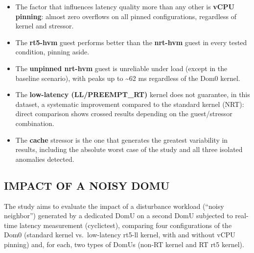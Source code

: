 \begin{itemize}
\item
  The factor that influences latency quality more than any other is
  \textbf{vCPU pinning}: almost zero overflows on all pinned
  configurations, regardless of kernel and stressor.
\item
  The \textbf{rt5-hvm} guest performs better than the \textbf{nrt-hvm}
  guest in every tested condition, pinning aside.
\item
  The \textbf{unpinned nrt-hvm} guest is unreliable under load (except
  in the baseline scenario), with peaks up to \textasciitilde62 ms
  regardless of the Dom0 kernel.
\item
  The \textbf{low-latency (LL/PREEMPT\_RT)} kernel does not guarantee,
  in this dataset, a systematic improvement compared to the standard
  kernel (NRT): direct comparison shows crossed results depending on the
  guest/stressor combination.
\item
  The \textbf{cache} stressor is the one that generates the greatest
  variability in results, including the absolute worst case of the study
  and all three isolated anomalies detected.
\end{itemize}

\subsection{IMPACT OF A NOISY DOMU}\label{impact-of-a-noisy-domu}

The study aims to evaluate the impact of a disturbance workload (``noisy
neighbor'') generated by a dedicated DomU on a second DomU subjected to
real-time latency measurement (cyclictest), comparing four
configurations of the Dom0 (standard kernel vs.~low-latency rt5-ll
kernel, with and without vCPU pinning) and, for each, two types of DomUs
(non-RT kernel and RT rt5 kernel).

